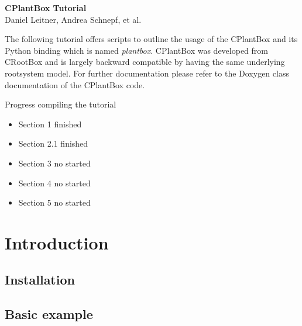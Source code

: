\documentclass[a4paper]{article}
\begin{document}
\begin{center}
\vspace{0.5 cm}
\huge{\textbf{CPlantBox Tutorial}} \\
\vspace{0.5 cm}
\normalsize
Daniel Leitner, Andrea Schnepf, et al. \\
\end{center}

\vspace{0.5 cm}

\noindent 
The following tutorial offers scripts to outline the usage of the CPlantBox \citep{zhou2020cplantbox} and its Python binding which is named \emph{plantbox}. CPlantBox was developed from CRootBox \citep{schnepf2018crootbox} and is largely backward compatible by having the same underlying rootsystem model. For further documentation please refer to the Doxygen class documentation of the CPlantBox code.
 

\vspace{0.5 cm}

\tableofcontents

\newpage 

Progress compiling the tutorial

\begin{itemize}
 \item Section 1 finished
 \item Section 2.1 finished
 \item Section 3 no started
 \item Section 4 no started
 \item Section 5 no started 
\end{itemize}




\newpage
\section{Introduction} \label{sec:introduction}

\subsection{Installation} \label{ssec:installation}


\subsection{Basic example} \label{ssec:basic_example}

\end{document}
